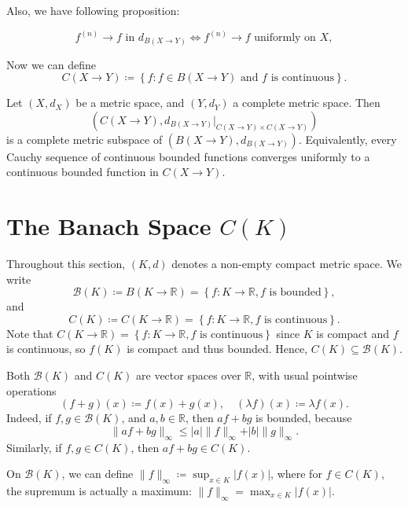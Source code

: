 Also, we have following proposition:
\newpage
\begin{proposition}[Analysis I] \label{prop: uniform metric}
    \[
        f^{(n)} \to f \text{ in } d_{B(X \to Y)} \iff f^{(n)} \to f \text{ uniformly on } X,  
    \]
\end{proposition}

Now we can define
\[
    C(X \to Y) \coloneqq \left\{ f: f \in B(X \to Y) \text{ and } f \text{ is continuous}   \right\}. 
\]

\begin{theorem}
    Let \((X, d_X)\) be a metric space, and \((Y, d_Y)\) a complete metric space. Then 
    \[
        \left( C(X \to Y), d_{B(X \to Y)}  \vert_ {C(X \to Y) \times C(X \to Y)} \right) 
    \]  
    is a complete metric subspace of \((B(X \to Y), d_{B(X \to Y)})\). Equivalently, every Cauchy sequence of continuous bounded functions converges uniformly to a continuous bounded function in \(C(X \to Y)\).   
\end{theorem}

\section{The Banach Space \(C(K)\)}
Throughout this section, \((K,d)\) denotes a non-empty compact metric space. We write 
\[
    \mathcal{B} (K) \coloneqq B(K \to \mathbb{R}) = \left\{ f: K \to \mathbb{R}, f \text{ is bounded}  \right\},
\] 
and 
\[
    C(K) \coloneqq C(K \to \mathbb{R}) = \left\{ f: K \to \mathbb{R}, f \text{ is continuous}  \right\}. 
\]
Note that \(C(K \to \mathbb{R} ) = \left\{ f: K \to \mathbb{R}, f \text{ is continuous}  \right\}\) since \(K\) is compact and \(f\) is continuous,  so \(f(K)\) is compact and thus bounded. Hence, \(C(K) \subseteq \mathcal{B}(K)\). 

Both \(\mathcal{B}(K)\) and \(C(K)\) are vector spaces over \(\mathbb{R}\), with usual pointwise operations
\[
    (f + g)(x) \coloneqq f(x) + g(x), \quad (\lambda f)(x) \coloneqq \lambda f(x).
\]   
Indeed, if \(f, g \in \mathcal{B} (K)\), and \(a, b \in \mathbb{R}\), then \(a f + b g\) is bounded, because 
\[
    \lVert af + bg \rVert_{\infty} \le \vert a \vert  \lVert f \rVert_{\infty } + \vert b \vert \lVert g \rVert_{\infty}.
\]   
Similarly, if \(f, g \in C(K)\), then \(af + bg \in C(K)\).

On \(\mathcal{B} (K)\), we can define \(\lVert f \rVert_{\infty} \coloneqq \sup _{x \in K} \vert f(x) \vert  \), where for \(f \in C(K)\), the supremum is actually a maximum: \(\lVert f \rVert_{\infty } = \max _{x \in K} \vert f(x) \vert  \).    

